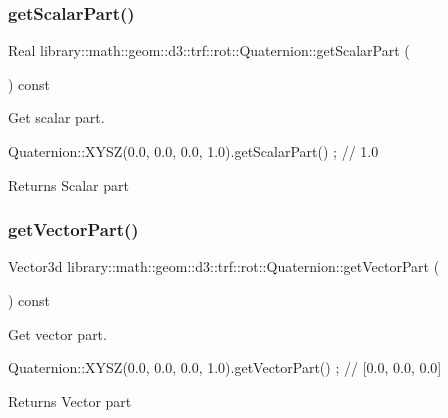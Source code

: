 \subsubsection{\texorpdfstring{get\+Scalar\+Part()}{getScalarPart()}}
{\footnotesize\ttfamily Real library\+::math\+::geom\+::d3\+::trf\+::rot\+::\+Quaternion\+::get\+Scalar\+Part (\begin{DoxyParamCaption}{ }\end{DoxyParamCaption}) const}



Get scalar part. 


\begin{DoxyCode}
Quaternion::XYSZ(0.0, 0.0, 0.0, 1.0).getScalarPart() ; \textcolor{comment}{// 1.0}
\end{DoxyCode}


\begin{DoxyReturn}{Returns}
Scalar part 
\end{DoxyReturn}
\mbox{\label{classlibrary_1_1math_1_1geom_1_1d3_1_1trf_1_1rot_1_1_quaternion_a5a00c3e85f0736ade6d887285afa16f9}} 
\subsubsection{\texorpdfstring{get\+Vector\+Part()}{getVectorPart()}}
{\footnotesize\ttfamily Vector3d library\+::math\+::geom\+::d3\+::trf\+::rot\+::\+Quaternion\+::get\+Vector\+Part (\begin{DoxyParamCaption}{ }\end{DoxyParamCaption}) const}



Get vector part. 


\begin{DoxyCode}
Quaternion::XYSZ(0.0, 0.0, 0.0, 1.0).getVectorPart() ; \textcolor{comment}{// [0.0, 0.0, 0.0]}
\end{DoxyCode}


\begin{DoxyReturn}{Returns}
Vector part 
\end{DoxyReturn}
\mbox{\label{classlibrary_1_1math_1_1geom_1_1d3_1_1trf_1_1rot_1_1_quaternion_a9d35d28051651be52dde4f495f23cf7a}} 
